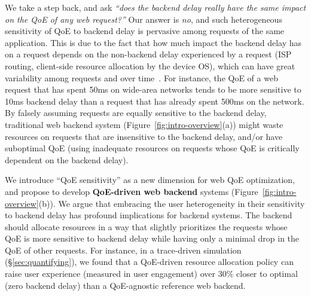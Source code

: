 We take a step back, and ask {\em ``does the backend delay really have the same impact on the QoE of any web request?''}
Our answer is {\em no}, and such heterogeneous sensitivity of QoE to backend delay is pervasive among requests of the same application. 
This is due to the fact that how much impact the backend delay has on a request depends on the non-backend delay experienced by a request (\eg ISP routing, client-side resource allocation by the device OS), which can have great variability among requests and over time~\cite{timecard,dqbarge}.
For instance, the QoE of a web request that has spent 50ms on wide-area networks tends to be more sensitive to 10ms backend delay than a request that has already spent 500ms on the network.
By falsely assuming requests are equally sensitive to the backend delay, traditional web backend system (Figure~\ref{fig:intro-overview}(a)) might waste resources on requests that are insensitive to the backend delay, and/or have suboptimal QoE (\eg using inadequate resources on requests whose QoE is critically dependent on the backend delay). 

We introduce ``QoE sensitivity'' as a new dimension for web QoE optimization, and propose to develop {\bf QoE-driven web backend} systems (Figure~\ref{fig:intro-overview}(b)). 
We argue that embracing the user heterogeneity in their sensitivity to backend delay has profound implications for backend systems.
The backend should allocate resources in a way that slightly prioritizes the requests whose QoE is more sensitive to backend delay while having only a minimal drop in the QoE of other requests.
For instance, in a trace-driven simulation (\S\ref{sec:quantifying}), we found that a QoE-driven resource allocation policy can raise user experience (measured in user engagement) over 30\% closer to optimal (\ie zero backend delay) than a QoE-agnostic reference web backend.

